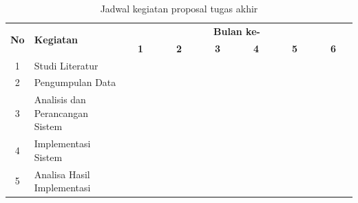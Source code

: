 \documentclass[a4paper,12pt,oneside]{book}
\begin{document}
\begin{table}[h!]
  \centering
    \caption{Jadwal kegiatan proposal tugas akhir}
  \label{Novella}
  \begin{tabular}{|c|m{2.5cm}|m{0.01cm}|m{0.01cm}|m{0.01cm}|m{0.01cm}|m{0.01cm}|m{0.01cm}|m{0.01cm}|m{0.01cm}|m{0.01cm}|m{0.01cm}|m{0.01cm}|m{0.01cm}|m{0.01cm}|m{0.01cm}|m{0.01cm}|m{0.01cm}|m{0.01cm}|m{0.01cm}|m{0.01cm}|m{0.01cm}|m{0.01cm}|m{0.01cm}|m{0.01cm}|m{0.01cm}|}
    \hline
    \multirow{2}{*}{\textbf{No}} & \multirow{2}{*}{\textbf{Kegiatan}} & \multicolumn{24}{|c|}{\textbf{Bulan ke-}} \\
    \hhline{~~------------------------}
    {} & {} & \multicolumn{4}{|c|}{\textbf{1}} & \multicolumn{4}{|c|}{\textbf{2}} & \multicolumn{4}{|c|}{\textbf{3}} & \multicolumn{4}{|c|}{\textbf{4}} & \multicolumn{4}{|c|}{\textbf{5}} & \multicolumn{4}{|c|}{\textbf{6}}\\
    \hline
    1 & Studi Literatur & \cellcolor{blue!25} & \cellcolor{blue!25} & \cellcolor{blue!25} & \cellcolor{blue!25}& \cellcolor{blue!25} & \cellcolor{blue!25} & \cellcolor{blue!25} & \cellcolor{blue!25}& \cellcolor{blue!25} & \cellcolor{blue!25} & \cellcolor{blue!25} & \cellcolor{blue!25}& \cellcolor{blue!25} & \cellcolor{blue!25} & \cellcolor{blue!25} & \cellcolor{blue!25}& \cellcolor{blue!25} & \cellcolor{blue!25} & \cellcolor{blue!25} & \cellcolor{blue!25}& \cellcolor{blue!25} & \cellcolor{blue!25} & \cellcolor{blue!25} & \cellcolor{blue!25}\\
    \hline
    2 & Pengumpulan Data & \cellcolor{blue!25} & \cellcolor{blue!25} & \cellcolor{blue!25} & \cellcolor{blue!25} & {} & {} & {} & {} & {} & {} & {} & {}& {} & {} & {} & {}& {} & {} & {} & {}& {} & {} & {} & {}\\
    \hline
    3 & Analisis dan Perancangan Sistem &  {} & {} & {} & {}  & \cellcolor{blue!25} & \cellcolor{blue!25} & \cellcolor{blue!25} & \cellcolor{blue!25} & \cellcolor{blue!25} & \cellcolor{blue!25} & \cellcolor{blue!25} & \cellcolor{blue!25} & {} & {} & {} & {}& {} & {} & {} & {}& {} & {} & {} & {}\\
    \hline
    4 & Implementasi Sistem &  {} & {} & {} & {} & {} & {} & {} & {}& \cellcolor{blue!25} & \cellcolor{blue!25} & \cellcolor{blue!25} & \cellcolor{blue!25} & \cellcolor{blue!25} & \cellcolor{blue!25} & \cellcolor{blue!25} & \cellcolor{blue!25} & {} & {} & {} & {}& {} & {} & {} & {}\\
    \hline
    5 & Analisa Hasil Implementasi &  {} & {} & {} & {} & {} & {} & {} & {}& {} & {} & {} & {} & \cellcolor{blue!25} & \cellcolor{blue!25} & \cellcolor{blue!25} & \cellcolor{blue!25} & \cellcolor{blue!25} & \cellcolor{blue!25} & \cellcolor{blue!25} & \cellcolor{blue!25} & {} & {} & {} & {}\\

\end{tabular}
\end{table}
\end{document}
